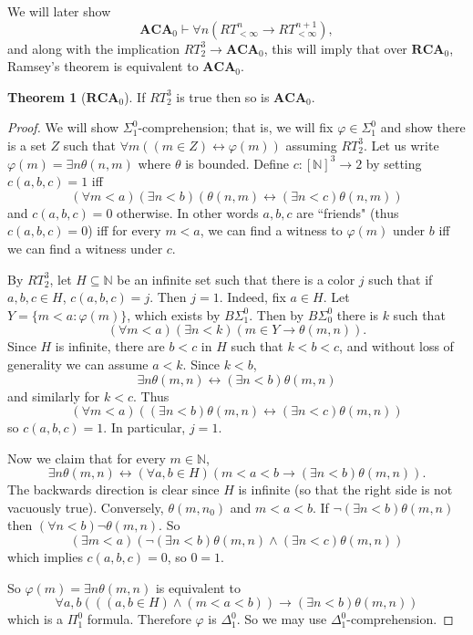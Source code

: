 \documentclass[12pt]{book}
\newcommand{\NN}{\mathbb{N}}
\newcommand{\ACA}{\mathbf{ACA}}
\newcommand{\RCA}{\mathbf{RCA}}
\theoremstyle{definition}
\newtheorem{theorem}{Theorem}[chapter]
\begin{document}
We will later show
$$\ACA_0 \vdash \forall n(RT_{<\infty}^n \to RT^{n+1}_{<\infty}),$$
and along with the implication $RT^3_2 \to \ACA_0$, this will imply that over $\RCA_0$, Ramsey's theorem is equivalent to $\ACA_0$.

\begin{theorem}[$\RCA_0$]
If $RT^3_2$ is true then so is $\ACA_0$.
\end{theorem}
\begin{proof}
We will show $\Sigma_1^0$-comprehension; that is, we will fix $\varphi \in \Sigma_1^0$ and show there is a set $Z$ such that $\forall m((m \in Z) \leftrightarrow \varphi(m))$ assuming $RT^3_2$.
Let us write $\varphi(m) = \exists n \theta(n, m)$ where $\theta$ is bounded.
Define $c: [\NN]^3 \to 2$ by setting $c(a, b, c) = 1$ iff
$$(\forall m < a)(\exists n < b)(\theta(n, m) \leftrightarrow (\exists n < c) \theta(n, m))$$
and $c(a, b, c) = 0$ otherwise.
In other words $a,b,c$ are ``friends" (thus $c(a, b, c) = 0$) iff for every $m < a$, we can find a witness to $\varphi(m)$ under $b$ iff we can find a witness under $c$.

By $RT_2^3$, let $H \subseteq \NN$ be an infinite set such that there is a color $j$ such that if $a, b, c \in H$, $c(a, b, c) = j$.
Then $j = 1$. Indeed, fix $a \in H$.
Let $Y = \{m < a: \varphi(m)\}$, which exists by $B\Sigma_1^0$.
Then by $B\Sigma_0^0$ there is $k$ such that
$$(\forall m < a)(\exists n < k)(m \in Y \to \theta(m, n)).$$
Since $H$ is infinite, there are $b < c$ in $H$ such that $k < b < c$, and without loss of generality we can assume $a < k$.
Since $k < b$,
$$\exists n \theta(m, n) \leftrightarrow (\exists n < b) \theta(m, n)$$
and similarly for $k < c$.
Thus
$$(\forall m < a)((\exists n < b)\theta(m, n) \leftrightarrow (\exists n < c)\theta(m, n))$$
so $c(a, b, c) = 1$.
In particular, $j = 1$.

Now we claim that for every $m \in \NN$,
$$\exists n \theta(m, n) \leftrightarrow (\forall a,b \in H)(m < a < b \to (\exists n < b)\theta(m, n)).$$
The backwards direction is clear since $H$ is infinite (so that the right side is not vacuously true).
Conversely, $\theta(m, n_0)$ and $m < a < b$.
If $\neg(\exists n < b) \theta(m, n)$ then $(\forall n < b)\neg \theta(m, n)$.
So
$$(\exists m < a)(\neg(\exists n < b) \theta(m, n) \wedge (\exists n < c)\theta(m, n))$$
which implies $c(a, b, c) = 0$, so $0 = 1$.

So $\varphi(m) = \exists n \theta(m, n)$ is equivalent to
$$\forall a, b(((a, b \in H) \wedge (m < a < b)) \to (\exists n < b)\theta(m, n))$$
which is a $\Pi_1^0$ formula.
Therefore $\varphi$ is $\Delta_1^0$.
So we may use $\Delta_1^0$-comprehension.
\end{proof}
\end{document}
